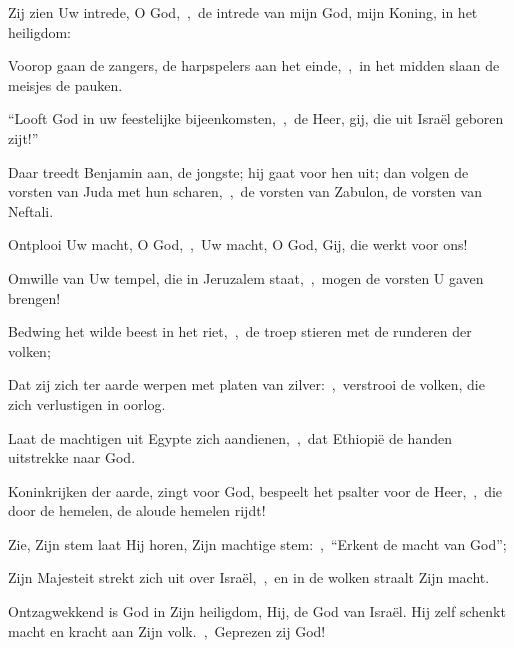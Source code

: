 \documentclass[12pt,twoside,a5paper]{article}
\begin{document}
\begin{halfparskip}
  Zij zien Uw intrede, O God,~\sep\ de intrede van mijn God, mijn Koning, in het heiligdom:

  Voorop gaan de zangers, de harpspelers aan het einde,~\sep\ in het midden slaan de meisjes de pauken.

  ``Looft God in uw feestelijke bijeenkomsten,~\sep\ de Heer, gij, die uit Israël geboren zijt!''

  Daar treedt Benjamin aan, de jongste; hij gaat voor hen uit; dan volgen de vorsten van Juda met hun scharen,~\sep\ de vorsten van Zabulon, de vorsten van Neftali.
\end{halfparskip}


\begin{halfparskip}
  Ontplooi Uw macht, O God,~\sep\ Uw macht, O God, Gij, die werkt voor ons!

  Omwille van Uw tempel, die in Jeruzalem staat,~\sep\ mogen de vorsten U gaven brengen!

  Bedwing het wilde beest in het riet,~\sep\ de troep stieren met de runderen der volken;

  Dat zij zich ter aarde werpen met platen van zilver:~\sep\ verstrooi de volken, die zich verlustigen in oorlog.

  Laat de machtigen uit Egypte zich aandienen,~\sep\ dat Ethiopië de handen uitstrekke naar God.
\end{halfparskip}


\begin{halfparskip}
  Koninkrijken der aarde, zingt voor God, bespeelt het psalter voor de Heer,~\sep\ die door de hemelen, de aloude hemelen rijdt!

  Zie, Zijn stem laat Hij horen, Zijn machtige stem:~\sep\ ``Erkent de macht van God'';

  Zijn Majesteit strekt zich uit over Israël,~\sep\ en in de wolken straalt Zijn macht.

  Ontzagwekkend is God in Zijn heiligdom, Hij, de God van Israël. Hij zelf schenkt macht en kracht aan Zijn volk.~\sep\ Geprezen zij God!
\end{halfparskip}

\end{document}
